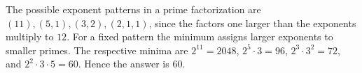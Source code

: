 The possible exponent patterns in a prime factorization are $(11),(5,1),(3,2),(2,1,1)$, since the factors one larger than the exponents multiply to $12$. For a fixed pattern the minimum assigns larger exponents to smaller primes. The respective minima are $2^{11}=2048$, $2^5\cdot3=96$, $2^3\cdot3^2=72$, and $2^2\cdot3\cdot5=60$. Hence the answer is $\boxed{60}$.
